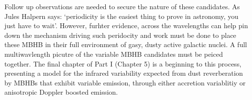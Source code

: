 Follow up observations are needed to secure the nature of these candidates. As
Jules Halpern says: `periodicity is the easiest thing to prove in astronomy,
you just have to wait'. However, furhter evidence, across the
wavelengths can help pin down the mechanism driving such peridocity and work
must be done to place these MBHB in their full environment of gasy, dusty
active galactic nuclei. A full multiwavlength picutre of the variable MBHB
candidates must be peiced together. The final chapter of Part I (Chapter 5) is
a beginning to this process, presenting a model for the infrared variability
expected from dust reverberation by MBHBs that exhibit variable emission,
through either accretion variablitiy or anisotropic Doppler boosted emission.




























